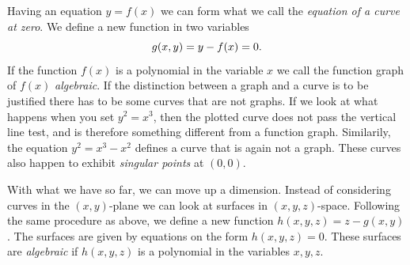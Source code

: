 \documentclass{article}
\begin{document}
Having an equation $y = f(x)$ we can form what we call the \emph{equation of a
curve at zero}. We define a new function in two variables
\begin{equation}
    \notag
    g(x, y) = y - f(x) = 0.
\end{equation}
If the function $f(x)$ is a polynomial in the variable $x$ we call the function
graph of $f(x)$ \emph{algebraic}. If the distinction between a graph and a
curve is to be justified there has to be some curves that are not graphs. If we
look at what happens when you set $y^2 = x^3$, then the plotted curve does not
pass the vertical line test, and is therefore something different from a
function graph. Similarily, the equation $y^2 = x^3 - x^2$ defines a curve that
is again not a graph. These curves also happen to exhibit \emph{singular
points} at $(0, 0)$.

With what we have so far, we can move up a dimension. Instead of considering
curves in the $(x, y)$-plane we can look at surfaces in $(x, y, z)$-space.
Following the same procedure as above, we define a new function $h(x, y, z) = z
- g(x, y)$. The surfaces are given by equations on the form $h(x, y, z) = 0$.
These surfaces are \emph{algebraic} if $h(x,
y, z)$ is a polynomial in the variables $x, y, z$. 
\end{document}
